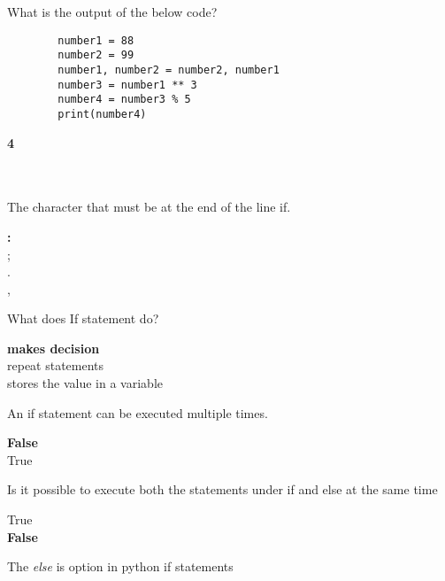 \documentclass{exam}
\begin{document}
\begin{questions}
      \question What is the output of the below code?

      \begin{verbatim}
        number1 = 88
        number2 = 99
        number1, number2 = number2, number1
        number3 = number1 ** 3
        number4 = number3 % 5
        print(number4)
      \end{verbatim}

      \begin{oneparchoices}
        \choice \textbf{4} \\
         \\
         \\
      \end{oneparchoices}

      \question The character that must be at the end of the line if.

      \begin{oneparchoices}
          \choice \textbf{:} \\
          \choice ; \\
          \choice . \\
          \choice ,
      \end{oneparchoices}

      \question What does If statement do?

      \begin{oneparchoices}
          \choice \textbf{makes decision} \\
          \choice repeat statements \\
          \choice stores the value in a variable
      \end{oneparchoices}

      \question An if statement can be executed multiple times.

      \begin{oneparchoices}
          \choice \textbf{False} \\
          \choice True
      \end{oneparchoices}

      \question Is it possible to execute both the statements under if and else at the same time

      \begin{oneparchoices}
          \choice True \\
          \choice \textbf{False}
      \end{oneparchoices}

      \question The \emph{else} is option in python if statements


\end{questions}
\end{document}
